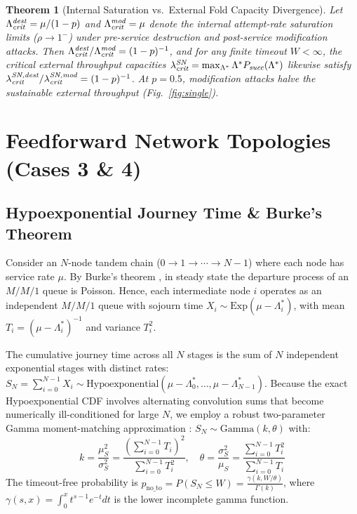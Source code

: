 \documentclass[journal,compsoc]{IEEEtran}
\newtheorem{theorem}{Theorem}
\begin{document}
\begin{theorem}[Internal Saturation vs.\ External Fold Capacity Divergence]
Let $\Lambda_{\emph{crit}}^{\emph{dest}} = \mu/(1-p)$ and $\Lambda_{\emph{crit}}^{\emph{mod}} = \mu$ denote the internal attempt-rate saturation limits ($\rho \to 1^-$) under pre-service destruction and post-service modification attacks. Then $\Lambda_{\emph{crit}}^{\emph{dest}} / \Lambda_{\emph{crit}}^{\emph{mod}} = (1 - p)^{-1}$, and for any finite timeout $W < \infty$, the critical external throughput capacities $\lambda_{\emph{crit}}^{\emph{SN}} = \max_{\Lambda^*} \Lambda^* P_{\emph{succ}}(\Lambda^*)$ likewise satisfy $\lambda_{\emph{crit}}^{\emph{SN,dest}} / \lambda_{\emph{crit}}^{\emph{SN,mod}} = (1 - p)^{-1}$. At $p = 0.5$, modification attacks halve the sustainable external throughput (Fig.~\ref{fig:single}).
\end{theorem}

\section{Feedforward Network Topologies (Cases 3 \& 4)}

\subsection{Hypoexponential Journey Time \& Burke's Theorem}
Consider an $N$-node tandem chain ($0 \to 1 \to \cdots \to N\!-\!1$) where each node has service rate $\mu$. By Burke's theorem \cite{burke1956output}, in steady state the departure process of an $M/M/1$ queue is Poisson. Hence, each intermediate node $i$ operates as an independent $M/M/1$ queue with sojourn time $X_i \sim \text{Exp}(\mu - \Lambda_i^*)$, with mean $T_i = (\mu - \Lambda_i^*)^{-1}$ and variance $T_i^2$.

The cumulative journey time across all $N$ stages is the sum of $N$ independent exponential stages with distinct rates: $S_N = \sum_{i=0}^{N-1} X_i \sim \text{Hypoexponential}(\mu - \Lambda_0^*, \dots, \mu - \Lambda_{N-1}^*)$. Because the exact Hypoexponential CDF involves alternating convolution sums that become numerically ill-conditioned for large $N$, we employ a robust two-parameter Gamma moment-matching approximation \cite{altiok1985approximate, cox1955use}: $S_N \sim \text{Gamma}(k, \theta)$ with:
\begin{equation}
k = \frac{\mu_S^2}{\sigma_S^2} = \frac{\left(\sum_{i=0}^{N-1} T_i\right)^2}{\sum_{i=0}^{N-1} T_i^2}, \quad \theta = \frac{\sigma_S^2}{\mu_S} = \frac{\sum_{i=0}^{N-1} T_i^2}{\sum_{i=0}^{N-1} T_i}
\label{eq:gamma_moments}
\end{equation}
The timeout-free probability is $p_{\text{no\_to}} = P(S_N \le W) = \frac{\gamma(k, W/\theta)}{\Gamma(k)}$, where $\gamma(s, x) = \int_0^x t^{s-1} e^{-t} dt$ is the lower incomplete gamma function.
\end{document}
